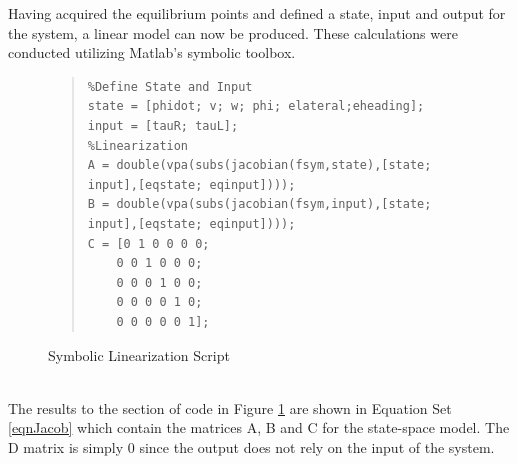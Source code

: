 \documentclass[12pt]{article}
\begin{document}
Having acquired the equilibrium points and defined a state, input and output for the system, a linear model can now be produced.  These calculations were conducted utilizing Matlab's symbolic toolbox. 
\\
\begin{figure}[!h]
\begin{quote}
\begin{lstlisting}
%Define State and Input
state = [phidot; v; w; phi; elateral;eheading];
input = [tauR; tauL];
%Linearization
A = double(vpa(subs(jacobian(fsym,state),[state; input],[eqstate; eqinput])));
B = double(vpa(subs(jacobian(fsym,input),[state; input],[eqstate; eqinput])));
C = [0 1 0 0 0 0; 
    0 0 1 0 0 0; 
    0 0 0 1 0 0; 
    0 0 0 0 1 0; 
    0 0 0 0 0 1];
\end{lstlisting}
\end{quote}
\caption{Symbolic Linearization Script\label{fig:linear}}
\end{figure} 
\\
The results to the section of code in Figure \ref{fig:linear} are shown in Equation Set \eqref{eqnJacob} which contain the matrices A, B and C for the state-space model. The D matrix is simply 0 since the output does not rely on the input of the system.
\\ \\ 
\end{document}
